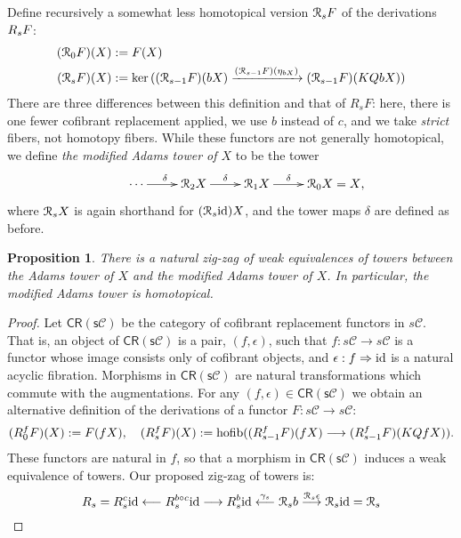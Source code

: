 \documentclass[11pt]{amsart}
\theoremstyle{plain}
\newtheorem{prop}[thm]{Proposition}
\theoremstyle{definition}
\renewcommand{\ker}{\textup{ker}\,}
\DeclareMathOperator*{\hofib}{hofib}
\renewcommand{\to}{\longrightarrow}
\newcommand{\from}{\longleftarrow}
\newcommand{\calR}{\mathcal{R}}
\newcommand{\calC}{\mathcal{C}}
\theoremstyle{plain}
\newcommand{\Id}{\textup{id}}
\newcommand{\algcat}{{\calC}}%
\newcommand{\dupdown}[2]{R_{\smash{#1}}}
\newcommand{\caldup}[1]{\calR_{\smash{#1}}}
\newcommand{\plainD}{R}
\newcommand{\barConstructionMightAbbreviate}{b}
\begin{document}
\begin{BK spec seq}
\begin{connectivity}
Define recursively a somewhat less homotopical version $\caldup{s}F$ of the derivations $\dupdown{s}{}F$:
\begin{alignat*}{2}
(\caldup{0}F)(X)
&:=
F(X)%
\\
(\caldup{s}F)(X)
&:=
\ker((\caldup{s-1}F)(\barConstructionMightAbbreviate X)\xrightarrow{(\caldup{s-1}F)(\eta_{\barConstructionMightAbbreviate X})} (\caldup{s-1}F)(KQ\barConstructionMightAbbreviate X))
\end{alignat*}
There are three differences between this definition and that of $\plainD_sF$: here, there is one fewer cofibrant replacement applied, we use $\barConstructionMightAbbreviate $ instead of  $c$, and we take \emph{strict} fibers, not homotopy fibers.
While these functors are not generally homotopical, we define \emph{the modified Adams tower of $X$} to be the tower
\[\xymatrix@R=4mm{
\cdots 
\ar[r]^{\delta}
&%
\caldup{2}X
\ar[r]^{\delta}
&%
\caldup{1}X
\ar[r]^{\delta}&%
\caldup{0}X\makebox[0cm][l]{${}=X$,}
}\]
where $\caldup{s}X$ is again shorthand for $(\caldup{s}\Id )X$, and the tower maps $\delta$ are defined as before.
\begin{prop}\label{prop:modifiedAdamsTower}
There is a natural zig-zag of weak equivalences of towers between the Adams tower of $X$ and the modified Adams tower of $X$. In particular, the modified Adams tower is homotopical.
\end{prop}
\begin{proof}
Let $\mathsf{CR(s\algcat)}$ be the category of cofibrant replacement functors in $s\algcat$. That is, an object of $\mathsf{CR(s\algcat)}$ is a pair, $(f,\epsilon)$, such that $f:s\algcat\to s\algcat$ is a functor whose image consists only of cofibrant objects, and $\epsilon:f\Rightarrow \Id $ is a natural acyclic fibration. Morphisms in $\mathsf{CR(s\algcat)}$ are natural transformations which commute with the augmentations. For any $(f,\epsilon)\in\mathsf{CR(s\algcat)}$ we obtain an alternative definition of the derivations of a functor $F:s\algcat\to s\algcat$:
\begin{alignat*}{2}
(\plainD_{\smash{0}}^{\smash{f}}F)(X)
:=
F(fX),\quad %
(\plainD_{\smash{s}}^{\smash{f}}F)(X)
:=
\hofib((\plainD_{\smash{s-1}}^{\smash{f}}F)(fX)\to (\plainD_{\smash{s-1}}^{\smash{f}}F)(KQfX)).
\end{alignat*}
These functors are natural in $f$, so that a morphism in $\mathsf{CR(s\algcat)}$ induces a weak equivalence of towers. Our proposed zig-zag of towers is: 
\[\plainD_{\smash{s}}= \plainD_{\smash{s}}^{\smash{c}}\Id \overset{}{\from}\plainD_{\smash{s}}^{\smash{\barConstructionMightAbbreviate \circ c}}\Id \overset{}{\to}\plainD_{\smash{s}}^{\smash{\barConstructionMightAbbreviate }}\Id \overset{\gamma_s}{\from}\caldup{s}\barConstructionMightAbbreviate \overset{\caldup{s}\epsilon}{\to}\caldup{s}\Id =\caldup{s}\]

\end{proof}
\end{connectivity}
\end{BK spec seq}
\end{document}
